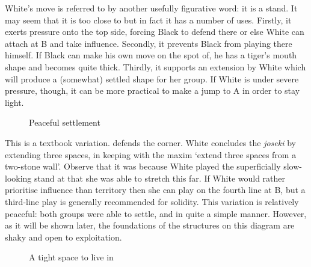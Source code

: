 \documentclass[a5paper,12pt,twoside]{book} %
\newcounter{joseki}                 %
\begin{document}
White's move{\large\whitestone[3]} is referred to by another usefully figurative word: it is a stand. It may seem that it is too close to{\large\whitestone[1]} but in fact it has a number of uses. Firstly, it exerts pressure onto the top side, forcing Black to defend there or else White can attach at B and take influence. Secondly, it prevents Black from playing there himself. If Black can make his own move on the spot of{\large\whitestone[3]}, he has a tiger's mouth shape and becomes quite thick. Thirdly, it supports an extension by White which will produce a (somewhat) settled shape for her group. If White is under severe pressure, though, it can be more practical to make a jump to A in order to stay light.\\

\begin{figure}[!htbp]
 
\vspace{-0.6cm}\caption{Peaceful settlement}
\label{4-4:kick-3}
\end{figure}

This is a textbook variation.{\large\blackstone[4]} defends the corner. White concludes the \textit{joseki} by extending three spaces, in keeping with the maxim `extend three spaces from a two-stone wall'. Observe that it was because White played the superficially slow-looking stand at{\large\whitestone[3]} that she was able to stretch this far. If White would rather prioritise influence than territory then she can play on the fourth line at B, but a third-line play is generally recommended for solidity. This variation is relatively peaceful: both groups were able to settle, and in quite a simple manner. However, as it will be shown later, the foundations of the structures on this diagram are shaky and open to exploitation.\\

\begin{figure}[!htbp]
 
\vspace{-0.6cm}\caption{A tight space to live in}
\label{4-4:kick-4}
\end{figure}
\end{document}
